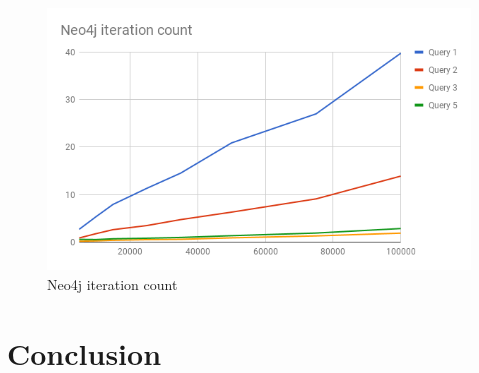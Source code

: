 \begin{figure}
  \centering
  \includegraphics[width=.8\textwidth]{img/neo4j-iteration-count.png}
  \caption{Neo4j iteration count}
  \label{fig:neo4j-iteration-count}
\end{figure}

\section{Conclusion}
\label{sec:empirical-study-conclusion}

